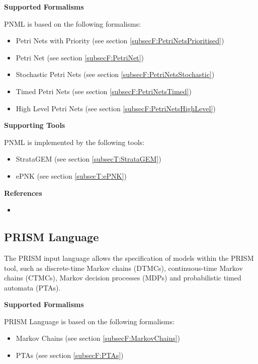 \textbf{Supported Formalisms}

PNML is based on the following formalisms:
\begin{itemize}
	\item Petri Nets with Priority (see section \ref{subsecF:PetriNetsPrioritised})
	\item Petri Net (see section \ref{subsecF:PetriNet})
	\item Stochastic Petri Nets (see section \ref{subsecF:PetriNetsStochastic})
	\item Timed Petri Nets (see section \ref{subsecF:PetriNetsTimed})
	\item High Level Petri Nets (see section \ref{subsecF:PetriNetsHighLevel})
\end{itemize}


\textbf{Supporting Tools}

PNML is implemented by the following tools:
\begin{itemize}
	\item StrataGEM (see section \ref{subsecT:StrataGEM})
	\item ePNK (see section \ref{subsecT:ePNK})
\end{itemize}


\textbf{References}
\begin{itemize}
	
\item {}
\end{itemize}



\subsection{PRISM Language}
\label{subsecL:PRISMLanguage}


The PRISM input language allows the specification of models within the PRISM tool, such as discrete-time Markov chains (DTMCs), continuous-time Markov chains (CTMCs), Markov decision processes (MDPs) and probabilistic timed automata (PTAs).

\textbf{Supported Formalisms}

PRISM Language is based on the following formalisms:
\begin{itemize}
	\item Markov Chains (see section \ref{subsecF:MarkovChains})
	\item PTAs (see section \ref{subsecF:PTAs})
\end{itemize}


